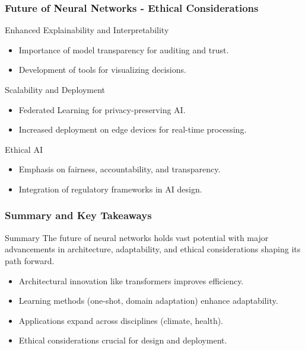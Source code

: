 \documentclass{beamer}
\begin{document}
\begin{frame}[fragile]
    \frametitle{Future of Neural Networks - Ethical Considerations}
    \begin{block}{Enhanced Explainability and Interpretability}
        \begin{itemize}
            \item Importance of model transparency for auditing and trust.
            \item Development of tools for visualizing decisions.
        \end{itemize}
    \end{block}
    
    \begin{block}{Scalability and Deployment}
        \begin{itemize}
            \item Federated Learning for privacy-preserving AI.
            \item Increased deployment on edge devices for real-time processing.
        \end{itemize}
    \end{block}
    
    \begin{block}{Ethical AI}
        \begin{itemize}
            \item Emphasis on fairness, accountability, and transparency.
            \item Integration of regulatory frameworks in AI design.
        \end{itemize}
    \end{block}
\end{frame}

\begin{frame}[fragile]
    \frametitle{Summary and Key Takeaways}
    \begin{block}{Summary}
        The future of neural networks holds vast potential with major advancements in architecture, adaptability, and ethical considerations shaping its path forward.
    \end{block}
    
    \begin{itemize}
        \item Architectural innovation like transformers improves efficiency.
        \item Learning methods (one-shot, domain adaptation) enhance adaptability.
        \item Applications expand across disciplines (climate, health).
        \item Ethical considerations crucial for design and deployment.
    \end{itemize}
\end{frame}
\end{document}
